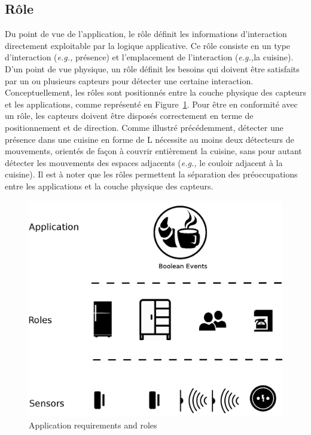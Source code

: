 \subsection{Rôle}
Du point de vue de l'application, le rôle définit les informations d'interaction directement exploitable par la logique applicative. Ce rôle consiste en un type d'interaction ({\em e.g.,} présence) et l'emplacement de l'interaction ({\em e.g.,}la cuisine). D'un point de vue physique, un rôle définit les besoins qui doivent être satisfaits par un ou plusieurs capteurs pour détecter une certaine interaction. Conceptuellement, les rôles sont positionnés entre la couche physique des capteurs et les applications, comme représenté en Figure~\ref{fig:appreqrole}. Pour être en conformité avec un rôle, les capteurs doivent être disposés correctement en terme de positionnement et de direction. Comme illustré précédemment, détecter une présence dans une cuisine en forme de L nécessite au moins deux détecteurs de mouvements, orientés de façon à couvrir entièrement la cuisine, sans pour autant détecter les mouvements des espaces adjacents ({\em e.g.,} le couloir adjacent à la cuisine). Il est à noter que les rôles permettent la séparation des préoccupations entre les applications et la couche physique des capteurs.

\begin{figure}[!h]
  \centering
  \includegraphics[scale=0.15]{gfx/Roles_etc.png}
  \caption{Application requirements and roles}
  \label{fig:appreqrole}
\end{figure}

